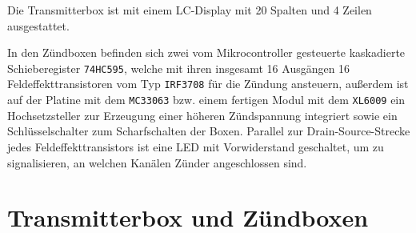 \documentclass[pdftex, parskip, numbers=noenddot, toc=listof]{scrbook}
\begin{document}
	Die Transmitterbox ist mit einem LC-Display mit 20 Spalten und 4 Zeilen ausgestattet.

	In den Zündboxen befinden sich zwei vom Mikrocontroller gesteuerte kaskadierte Schieberegister \texttt{74HC595}, welche mit ihren insgesamt 16 Ausgängen 16 Feldeffekttransistoren vom Typ \texttt{IRF3708} für die Zündung ansteuern, außerdem ist auf der Platine mit dem \texttt{MC33063} bzw. einem fertigen Modul mit dem \texttt{XL6009} ein Hochsetzsteller zur Erzeugung einer höheren Zündspannung integriert sowie ein Schlüsselschalter zum Scharfschalten der Boxen. Parallel zur Drain-Source-Strecke jedes Feldeffekttransistors ist eine LED mit Vorwiderstand geschaltet, um zu signalisieren, an welchen Kanälen Zünder angeschlossen sind.



	\section{Transmitterbox und Zündboxen}
\end{document}
